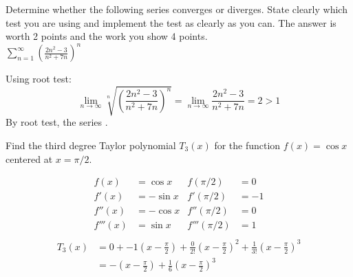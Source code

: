 \documentclass[12pt,answers]{exam}
\begin{document}
\begin{questions}

\question[6]
Determine whether the following series converges or diverges.
State clearly which test you are using and implement the test as clearly as you can.
The answer is worth 2 points and the work you show 4 points.
\\
$\displaystyle \sum_{n=1}^\infty \left(\frac{2n^2-3}{n^2+7n}\right)^n$
\begin{solution}
    Using root test:
    \[
        \lim_{n\to\infty} \sqrt[n]{\left(\frac{2n^2-3}{n^2+7n}\right)^n}
        = \lim_{n\to\infty} \frac{2n^2-3}{n^2+7n} = 2 > 1
    \]
    By root test, the series .
\end{solution}

\newpage
\question[12]
Find the third degree Taylor polynomial $T_3(x)$ for the function $f(x) = \cos x$ centered at $x = \pi/2$.
\begin{solution}
    \begin{align*}
        f(x) &= \cos x 
        &f(\pi/2) &= 0 \\ 
        f'(x) &= -\sin x 
        &f'(\pi/2) &= -1 \\ 
        f''(x) &= -\cos x 
        &f''(\pi/2) &= 0 \\ 
        f'''(x) &= \sin x 
        &f'''(\pi/2) &= 1 \\ 
    \end{align*}
    \begin{align*}
        T_3(x) 
        &= 0 + -1\left(x-\frac\pi2\right) + \frac{0}{2!} \left(x-\frac\pi2\right)^2 + \frac{1}{3!}\left(x-\frac\pi2\right)^3 \\
        &= \boxed{-\left(x-\frac\pi2\right) + \frac16 \left(x-\frac\pi2\right)^3}
    \end{align*}
\end{solution}


\end{questions}
\end{document}
